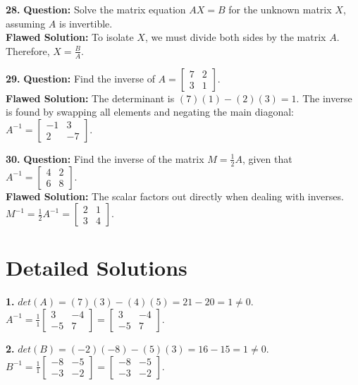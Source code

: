 \documentclass{article}
\begin{document}
\vspace{5pt}
\noindent
\textbf{28.} \textbf{Question:} Solve the matrix equation $AX = B$ for the unknown matrix $X$, assuming $A$ is invertible. \\
\textbf{Flawed Solution:} To isolate $X$, we must divide both sides by the matrix $A$. Therefore, $X = \frac{B}{A}$.

\vspace{5pt}
\noindent
\textbf{29.} \textbf{Question:} Find the inverse of $A = \begin{bmatrix} 7 & 2 \\ 3 & 1 \end{bmatrix}$. \\
\textbf{Flawed Solution:} The determinant is $(7)(1) - (2)(3) = 1$. The inverse is found by swapping all elements and negating the main diagonal: $A^{-1} = \begin{bmatrix} -1 & 3 \\ 2 & -7 \end{bmatrix}$. 

\vspace{5pt}
\noindent
\textbf{30.} \textbf{Question:} Find the inverse of the matrix $M = \frac{1}{2} A$, given that $A^{-1} = \begin{bmatrix} 4 & 2 \\ 6 & 8 \end{bmatrix}$. \\
\textbf{Flawed Solution:} The scalar factors out directly when dealing with inverses. $M^{-1} = \frac{1}{2} A^{-1} = \begin{bmatrix} 2 & 1 \\ 3 & 4 \end{bmatrix}$.

\newpage

\section{Detailed Solutions}

\textbf{1.} $det(A) = (7)(3) - (4)(5) = 21 - 20 = 1 \neq 0$. \\
$A^{-1} = \frac{1}{1} \begin{bmatrix} 3 & -4 \\ -5 & 7 \end{bmatrix} = \begin{bmatrix} 3 & -4 \\ -5 & 7 \end{bmatrix}$.

\vspace{5pt}
\noindent
\textbf{2.} $det(B) = (-2)(-8) - (5)(3) = 16 - 15 = 1 \neq 0$. \\
$B^{-1} = \frac{1}{1} \begin{bmatrix} -8 & -5 \\ -3 & -2 \end{bmatrix} = \begin{bmatrix} -8 & -5 \\ -3 & -2 \end{bmatrix}$.
\end{document}
